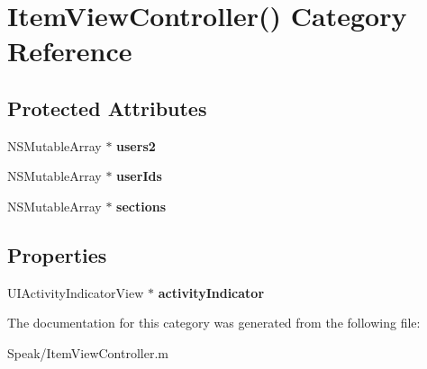 \hypertarget{category_item_view_controller_07_08}{}\section{Item\+View\+Controller() Category Reference}
\label{category_item_view_controller_07_08}
\subsection*{Protected Attributes}
\begin{DoxyCompactItemize}
\item 
\hypertarget{category_item_view_controller_07_08_ac4f17a1097be79e44192f1350b4bdf20}{}N\+S\+Mutable\+Array $\ast$ {\bfseries users2}\label{category_item_view_controller_07_08_ac4f17a1097be79e44192f1350b4bdf20}

\item 
\hypertarget{category_item_view_controller_07_08_adea67ab38c525222139e188bc6dd7193}{}N\+S\+Mutable\+Array $\ast$ {\bfseries user\+Ids}\label{category_item_view_controller_07_08_adea67ab38c525222139e188bc6dd7193}

\item 
\hypertarget{category_item_view_controller_07_08_a84d3deaaf6802e5d76a0f0d5055ec87e}{}N\+S\+Mutable\+Array $\ast$ {\bfseries sections}\label{category_item_view_controller_07_08_a84d3deaaf6802e5d76a0f0d5055ec87e}

\end{DoxyCompactItemize}
\subsection*{Properties}
\begin{DoxyCompactItemize}
\item 
\hypertarget{category_item_view_controller_07_08_a296870c7bd5c2b0242a14befa133bcd7}{}U\+I\+Activity\+Indicator\+View $\ast$ {\bfseries activity\+Indicator}\label{category_item_view_controller_07_08_a296870c7bd5c2b0242a14befa133bcd7}

\end{DoxyCompactItemize}


The documentation for this category was generated from the following file\+:\begin{DoxyCompactItemize}
\item 
Speak/Item\+View\+Controller.\+m\end{DoxyCompactItemize}
